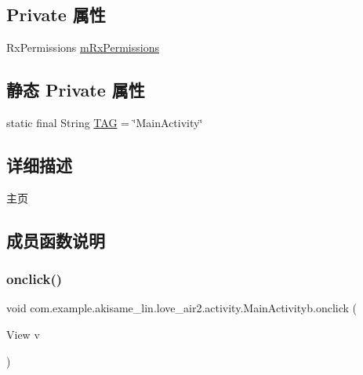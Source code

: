 \subsection*{Private 属性}
\begin{DoxyCompactItemize}
\item 
Rx\+Permissions \mbox{\hyperlink{classcom_1_1example_1_1akisame__lin_1_1love__air2_1_1activity_1_1_main_activityb_ad7ee78f0dbb555ab9261cd2dba57fedd}{m\+Rx\+Permissions}}
\end{DoxyCompactItemize}
\subsection*{静态 Private 属性}
\begin{DoxyCompactItemize}
\item 
static final String \mbox{\hyperlink{classcom_1_1example_1_1akisame__lin_1_1love__air2_1_1activity_1_1_main_activityb_abf463c211b9232ed90e4637289156618}{T\+AG}} = \char`\"{}Main\+Activity\char`\"{}
\end{DoxyCompactItemize}


\subsection{详细描述}
主页 

\subsection{成员函数说明}
\mbox{\label{classcom_1_1example_1_1akisame__lin_1_1love__air2_1_1activity_1_1_main_activityb_a536a4eaf6f7f132437f02923bf69a0ff}} 
\subsubsection{\texorpdfstring{onclick()}{onclick()}}
{\footnotesize\ttfamily void com.\+example.\+akisame\+\_\+lin.\+love\+\_\+air2.\+activity.\+Main\+Activityb.\+onclick (\begin{DoxyParamCaption}\item[{View}]{v }\end{DoxyParamCaption})\hspace{0.3cm}{\ttfamily [inline]}}

